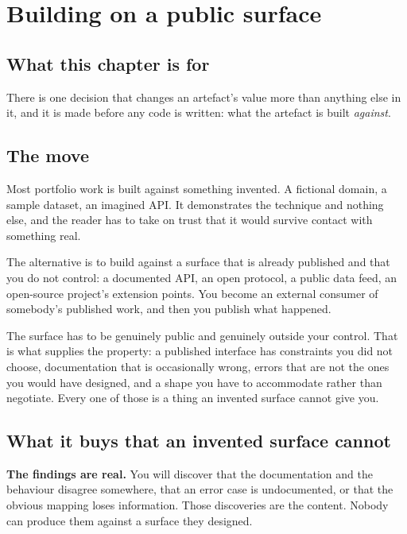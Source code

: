 \chapter{Building on a public surface}
\label{ch:surface}

\section*{What this chapter is for}

There is one decision that changes an artefact's value more than anything else
in it, and it is made before any code is written: what the artefact is built
\emph{against}.

\section{The move}

Most portfolio work is built against something invented. A fictional domain, a
sample dataset, an imagined API. It demonstrates the technique and nothing
else, and the reader has to take on trust that it would survive contact with
something real.

The alternative is to build against a surface that is already published and
that you do not control: a documented API, an open protocol, a public data
feed, an open-source project's extension points. You become an external
consumer of somebody's published work, and then you publish what happened.

\begin{kitnote}
The surface has to be genuinely public and genuinely outside your control. That
is what supplies the property: a published interface has constraints you did
not choose, documentation that is occasionally wrong, errors that are not the
ones you would have designed, and a shape you have to accommodate rather than
negotiate. Every one of those is a thing an invented surface cannot give you.
\end{kitnote}

\section{What it buys that an invented surface cannot}

\textbf{The findings are real.} You will discover that the documentation and
the behaviour disagree somewhere, that an error case is undocumented, or that
the obvious mapping loses information. Those discoveries are the content.
Nobody can produce them against a surface they designed.

